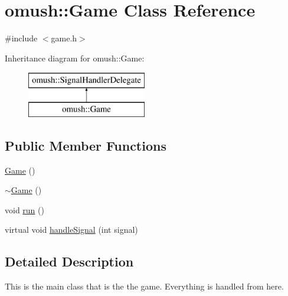 \hypertarget{classomush_1_1_game}{\section{omush\-:\-:Game Class Reference}
\label{classomush_1_1_game}
}


{\ttfamily \#include $<$game.\-h$>$}

Inheritance diagram for omush\-:\-:Game\-:\begin{figure}[H]
\begin{center}
\leavevmode
\includegraphics[height=2.000000cm]{classomush_1_1_game}
\end{center}
\end{figure}
\subsection*{Public Member Functions}
\begin{DoxyCompactItemize}
\item 
\hyperlink{classomush_1_1_game_a6e4e5e9f6edf99893895d0261423afc1}{Game} ()
\item 
\hyperlink{classomush_1_1_game_a8dd181346e8a62be54585a20b5e52588}{$\sim$\-Game} ()
\item 
void \hyperlink{classomush_1_1_game_aae6eb03bcbc479ce68eaf6a1b449665a}{run} ()
\item 
virtual void \hyperlink{classomush_1_1_game_a90582895228ea196287a36d35d21f3ba}{handle\-Signal} (int signal)
\end{DoxyCompactItemize}


\subsection{Detailed Description}
This is the main class that is the the game. Everything is handled from here. 

